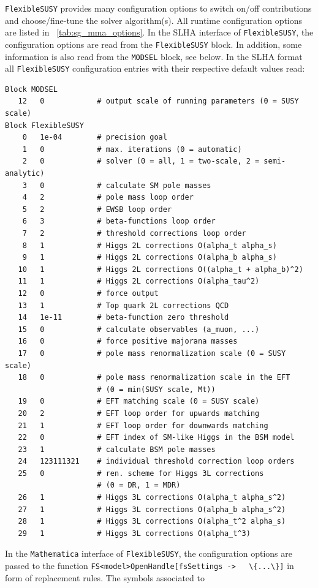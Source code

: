 \documentclass[final,3p,11pt,pdflatex]{elsarticle}
\makeatletter
\newcommand{\fs}{\texttt{FlexibleSUSY}\@\xspace}
\newcommand{\mathematica}{\texttt{Ma\-the\-ma\-ti\-ca}\xspace}
\newcommand{\code}[1]{\lstinline|#1|}  %
\newcommand{\tabref}[1]{\tablename~\ref{#1}}
\makeatother
\begin{document}
\fs provides many configuration options to switch on/off contributions
and choose/fine-tune the solver algorithm(s).  All runtime
configuration options are listed in \tabref{tab:sg_mma_options}.
%
In the SLHA interface of \fs, the configuration options are read from
the \fs block.  In addition, some information is also read
from the \texttt{MODSEL} block, see below.  In the SLHA format all \fs
configuration entries with their respective default values read:
%
\begin{lstlisting}
Block MODSEL
   12   0            # output scale of running parameters (0 = SUSY scale)
Block FlexibleSUSY
    0   1e-04        # precision goal
    1   0            # max. iterations (0 = automatic)
    2   0            # solver (0 = all, 1 = two-scale, 2 = semi-analytic)
    3   0            # calculate SM pole masses
    4   2            # pole mass loop order
    5   2            # EWSB loop order
    6   3            # beta-functions loop order
    7   2            # threshold corrections loop order
    8   1            # Higgs 2L corrections O(alpha_t alpha_s)
    9   1            # Higgs 2L corrections O(alpha_b alpha_s)
   10   1            # Higgs 2L corrections O((alpha_t + alpha_b)^2)
   11   1            # Higgs 2L corrections O(alpha_tau^2)
   12   0            # force output
   13   1            # Top quark 2L corrections QCD
   14   1e-11        # beta-function zero threshold
   15   0            # calculate observables (a_muon, ...)
   16   0            # force positive majorana masses
   17   0            # pole mass renormalization scale (0 = SUSY scale)
   18   0            # pole mass renormalization scale in the EFT
                     # (0 = min(SUSY scale, Mt))
   19   0            # EFT matching scale (0 = SUSY scale)
   20   2            # EFT loop order for upwards matching
   21   1            # EFT loop order for downwards matching
   22   0            # EFT index of SM-like Higgs in the BSM model
   23   1            # calculate BSM pole masses
   24   123111321    # individual threshold correction loop orders
   25   0            # ren. scheme for Higgs 3L corrections
                     # (0 = DR, 1 = MDR)
   26   1            # Higgs 3L corrections O(alpha_t alpha_s^2)
   27   1            # Higgs 3L corrections O(alpha_b alpha_s^2)
   28   1            # Higgs 3L corrections O(alpha_t^2 alpha_s)
   29   1            # Higgs 3L corrections O(alpha_t^3)
\end{lstlisting}
%
In the \mathematica interface of \fs, the configuration options are
passed to the function \code{FS<model>OpenHandle[fsSettings ->
  \{...\}]} in form of replacement rules.  The symbols associated to
\end{document}
